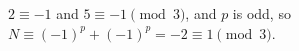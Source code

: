 $2\equiv-1$ and $5\equiv-1\pmod3$, and $p$ is odd, so $N\equiv(-1)^p+(-1)^p=-2\equiv\boxed{1}\pmod3$.
